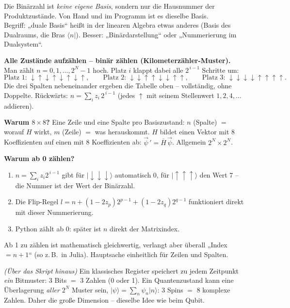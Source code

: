 \documentclass[11pt,a4paper]{article}
\newcommand{\ket}[1]{\lvert #1\rangle}
\newcommand{\bra}[1]{\langle #1\rvert}
\newcommand{\up}{{\uparrow}}
\newcommand{\dn}{{\downarrow}}
\newcommand{\Hbar}{\bar H}
\begin{document}
\begin{falle}
Die Binärzahl ist \emph{keine eigene Basis}, sondern nur die Hausnummer der Produktzustände. Von Hand und im Programm ist es dieselbe Basis. \\
Begriff: „duale Basis“ heißt in der linearen Algebra etwas anderes (Basis des Dualraums, die Bras $\bra n$). Besser: „Binärdarstellung“ oder „Nummerierung im Dualsystem“.
\end{falle}

\textbf{Alle Zustände aufzählen -- binär zählen (Kilometer\-zähler-Muster).}\\ Man zählt $n=0,1,\dots,2^N-1$ hoch. Platz $i$ klappt dabei alle $2^{\,i-1}$ Schritte um:
\[
\text{Platz 1: } \dn\up\dn\up\dn\up\dn\up,\qquad
\text{Platz 2: } \dn\dn\up\up\dn\dn\up\up,\qquad
\text{Platz 3: } \dn\dn\dn\dn\up\up\up\up .
\]
Die drei Spalten nebeneinander ergeben die Tabelle oben -- vollständig, ohne Doppelte. Rückwärts: $n = \sum_i z_i\,2^{\,i-1}$ (jedes $\up$ mit seinem Stellenwert $1,2,4,\dots$ addieren).

\textbf{Warum $8\times8$?} Eine Zeile und eine Spalte pro Basiszustand: $n$ (Spalte) $=$ worauf $H$ wirkt, $m$ (Zeile) $=$ was herauskommt. $H$ bildet einen Vektor mit 8 Koeffizienten auf einen mit 8 Koeffizienten ab: $\vec\psi\,' = \Hbar\,\vec\psi$. Allgemein $2^N\times2^N$.

\textbf{Warum ab 0 zählen?}
\begin{enumerate}[itemsep=1pt]
\item $n=\sum_i z_i2^{\,i-1}$ gibt für $\ket{\dn\dn\dn}$ automatisch $0$, für $\ket{\up\up\up}$ den Wert $7$ -- die Nummer ist der Wert der Binärzahl.
\item Die Flip-Regel $l = n + (1-2z_p)2^{p-1} + (1-2z_q)2^{q-1}$ funktioniert direkt mit dieser Nummerie\-rung.
\item Python zählt ab 0: später ist $n$ direkt der Matrixindex.
\end{enumerate}
Ab 1 zu zählen ist mathematisch gleichwertig, verlangt aber überall „Index $=n+1$“ (so z.\,B.\ in Julia). Hauptsache einheitlich für Zeilen und Spalten.

\begin{warum}
\emph{(Über das Skript hinaus)} Ein klassisches Register speichert zu jedem Zeitpunkt \emph{ein} Bitmuster: 3 Bits $=$ 3 Zahlen (0 oder 1). Ein Quantenzustand kann eine Überlagerung \emph{aller} $2^N$ Muster sein, $\ket\psi = \sum_n \psi_n\ket n$: 3 Spins $=$ 8 komplexe Zahlen. Daher die große Dimension -- dieselbe Idee wie beim Qubit.
\end{warum}
\end{document}
